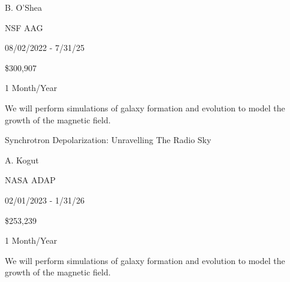 \documentclass[10pt]{article}
\begin{document}
 B. O'Shea

 NSF AAG 

 08/02/2022 - 7/31/25

 \$300,907

 1 Month/Year

We will perform simulations of galaxy formation and evolution to model the
growth of the magnetic field.

\vspace{0.1in}

 Synchrotron Depolarization: Unravelling The Radio Sky

 A. Kogut

 NASA ADAP

 02/01/2023 - 1/31/26

 \$253,239

 1 Month/Year

We will perform simulations of galaxy formation and evolution to model the
growth of the magnetic field.

\vspace{0.1in}
\end{document}
